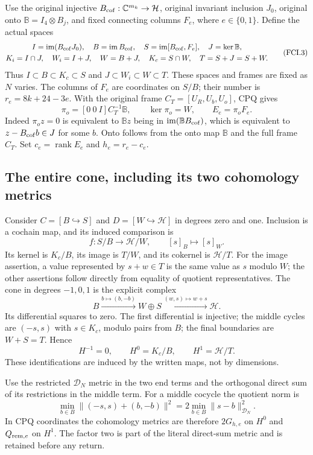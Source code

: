 Use the original injective $B_{\rm cof}:\mathbb C^{m_k}\to\mathcal H$,
original invariant inclusion $J_0$, original onto
$\mathbb B=I_4\otimes B_j$, and fixed connecting columns $F_e$,
where $e\in\{0,1\}$.  Define the actual spaces
\[
 \begin{gathered}
 I=\operatorname{im}(B_{\rm cof}J_0),\quad
 B=\operatorname{im}B_{\rm cof},\quad
 S=\operatorname{im}[B_{\rm cof},F_e],\quad J=\ker\mathbb B,\\
 K_i=I\cap J,\quad W_i=I+J,\quad W=B+J,\quad
 K_c=S\cap W,\quad T=S+J=S+W.
 \end{gathered}\tag{FCI.3}
\]
Thus $I\subset B\subset K_c\subset S$ and
$J\subset W_i\subset W\subset T$.  These spaces and frames are
fixed as $N$ varies.  The columns of $F_e$ are coordinates on $S/B$;
their number is $r_e=8k+24-3e$.  With the original frame
$C_T=[U_R,U_b,U_o]$, CPQ gives
\[
 \pi_o=[0\ 0\ I]C_T^{-1}\mathbb B,\qquad
 \ker\pi_o=W,\qquad E_e=\pi_oF_e.
 \tag{FCI.4}
\]
Indeed $\pi_oz=0$ is equivalent to $\mathbb Bz$ being in
$\operatorname{im}(\mathbb BB_{\rm cof})$, which is equivalent
to $z-B_{\rm cof}b\in J$ for some $b$.  Onto follows from
the onto map $\mathbb B$ and the full frame $C_T$.
Set $c_e=\operatorname{rank}E_e$ and $h_e=r_e-c_e$.

\subsection{The entire cone, including its two cohomology metrics}

Consider $C=[B\hookrightarrow S]$ and
$D=[W\hookrightarrow\mathcal H]$ in degrees zero and one.
Inclusion is a cochain map, and its induced comparison is
\[
 f:S/B\longrightarrow\mathcal H/W,\qquad [s]_B\longmapsto[s]_W.
 \tag{FCI.5}
\]
Its kernel is $K_c/B$, its image is $T/W$, and its cokernel is
$\mathcal H/T$.  For the image assertion, a value represented by
$s+w\in T$ is the same value as $s$ modulo $W$; the other assertions
follow directly from equality of quotient representatives.
The cone in degrees $-1,0,1$ is the explicit complex
\[
 B\xrightarrow{b\mapsto(b,-b)}W\oplus S
       \xrightarrow{(w,s)\mapsto w+s}\mathcal H.
 \tag{FCI.6}
\]
Its differential squares to zero.  The first differential is injective;
the middle cycles are $(-s,s)$ with $s\in K_c$, modulo pairs from $B$;
the final boundaries are $W+S=T$.  Hence
\[
 H^{-1}=0,\qquad H^0=K_c/B,\qquad H^1=\mathcal H/T.
 \tag{FCI.7}
\]
These identifications are induced by the written maps, not by dimensions.

Use the restricted $\mathcal D_N$ metric in the two end terms and the
orthogonal direct sum of its restrictions in the middle term.  For a
middle cocycle the quotient norm is
\[
 \min_{b\in B}\|(-s,s)+(b,-b)\|^2
       =2\min_{b\in B}\|s-b\|_{\mathcal D_N}^2.
 \tag{FCI.8}
\]
In CPQ coordinates the cohomology metrics are therefore $2G_{h,e}$
on $H^0$ and $Q_{{\rm rem},e}$ on $H^1$.  The factor two is part
of the literal direct-sum metric and is retained before any return.

